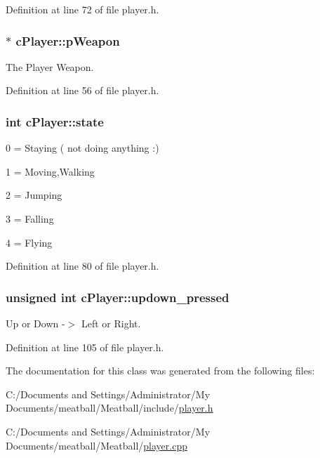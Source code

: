 Definition at line 72 of file player.\-h.

\hypertarget{classc_player_a9a423c004d02e40cd589be2bcdcb5fc3}{
\subsubsection[{p\-Weapon}]{$\ast$ c\-Player\-::p\-Weapon}}\label{classc_player_a9a423c004d02e40cd589be2bcdcb5fc3}


The Player Weapon. 



Definition at line 56 of file player.\-h.

\hypertarget{classc_player_a770b16e87c30e5ae205af92038fac0f9}{
\subsubsection[{state}]{\setlength{\rightskip}{0pt plus 5cm}int c\-Player\-::state}}\label{classc_player_a770b16e87c30e5ae205af92038fac0f9}
0 = Staying ( not doing anything \-:)\par
 1 = Moving,Walking\par
 2 = Jumping\par
 3 = Falling\par
 4 = Flying\par
 

Definition at line 80 of file player.\-h.

\hypertarget{classc_player_ac2cb468d98391a6b9fbaa6db2e103a2d}{
\subsubsection[{updown\-\_\-pressed}]{\setlength{\rightskip}{0pt plus 5cm}unsigned int c\-Player\-::updown\-\_\-pressed}}\label{classc_player_ac2cb468d98391a6b9fbaa6db2e103a2d}


Up or Down -\/$>$ Left or Right. 



Definition at line 105 of file player.\-h.



The documentation for this class was generated from the following files\-:\begin{DoxyCompactItemize}
\item 
C\-:/\-Documents and Settings/\-Administrator/\-My Documents/meatball/\-Meatball/include/\hyperlink{player_8h}{player.\-h}\item 
C\-:/\-Documents and Settings/\-Administrator/\-My Documents/meatball/\-Meatball/\hyperlink{player_8cpp}{player.\-cpp}\end{DoxyCompactItemize}
